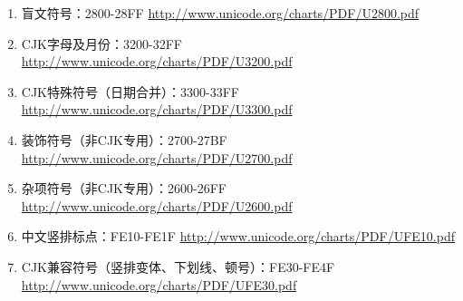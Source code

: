 \begin{enumerate}
  \item 盲文符号：2800-28FF \url{http://www.unicode.org/charts/PDF/U2800.pdf}
  \item CJK字母及月份：3200-32FF \url{http://www.unicode.org/charts/PDF/U3200.pdf}
  \item CJK特殊符号（日期合并）：3300-33FF \url{http://www.unicode.org/charts/PDF/U3300.pdf}
  \item 装饰符号（非CJK专用）：2700-27BF \url{http://www.unicode.org/charts/PDF/U2700.pdf}
  \item 杂项符号（非CJK专用）：2600-26FF \url{http://www.unicode.org/charts/PDF/U2600.pdf}
  \item 中文竖排标点：FE10-FE1F \url{http://www.unicode.org/charts/PDF/UFE10.pdf}
  \item CJK兼容符号（竖排变体、下划线、顿号）：FE30-FE4F \url{http://www.unicode.org/charts/PDF/UFE30.pdf}
\end{enumerate}
